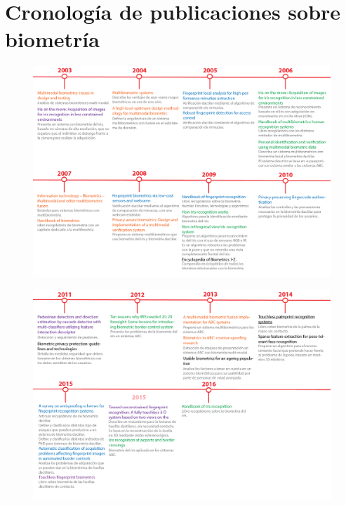 



\chapter{Cronología de publicaciones sobre biometría}\label{apendix:ApendiceCronologiaBiometria}

\begin{landscape}
 \begin{figure}
  \centering
  \includegraphics[width=1.4\textwidth]{ch-sistemasABC/images/ch-ImagenesApendices/CRONOLOGIA_BIOMETRIA-01.png}
  \label{fig:00_CRONOLOGIA_BIOMETRIA}
 \end{figure}
\end{landscape}

\begin{landscape}
 \begin{figure}
  \centering
  \includegraphics[width=1.4\textwidth]{ch-sistemasABC/images/ch-ImagenesApendices/CRONOLOGIA_BIOMETRIA-02.png}
  \label{fig:01_CRONOLOGIA_BIOMETRIA}
 \end{figure}
\end{landscape}


